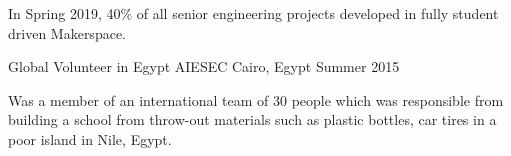 \begin{cventries}
{\begin{cvitems}
        \item {In Spring 2019, 40\% of all senior engineering projects developed in fully student driven Makerspace.}
     \end{cvitems}
    }
  \cvopenentry
    {Global Volunteer in Egypt } %
    {AIESEC} %
    {Cairo, Egypt} %
    {Summer 2015} %
    {
      \begin{cvitems} %
        \item {Was a member of an international team of 30 people which was responsible from building a school from throw-out materials such as plastic bottles, car tires in a poor island in Nile, Egypt. }
      \end{cvitems}
    }


\begin{comment}
Commented code
  \cventry
    {Reviewer and Participant} %
    {Algorithm Competition Programme} %
    {Inzva, Istanbul} %
    {Oct. 2018 - May. 2019} %
    {
      \begin{cvitems} %
        \item {Participated in the 30-week Algorithm Competition Programme which includes lectures, contests, and a variety of practises.}
      \end{cvitems}
    }
    \vspace{2mm}
\cventry
    {Member} %
    {Association for Computing Machinery Society} %
    {Koc Universtiy} %
    {Oct. 2017 - Present} %
    {
      \begin{cvitems} %
        \item {Responsible for organizing IoT and robotics related workshops, conferences for new members. }
        \item {Developing tech-projects to attend national and international competitions. }
      \end{cvitems}
    }


\end{comment}
\end{cventries}
